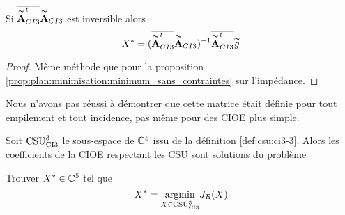     \begin{prop}
      Si \(\conj{\tilde{\mA}_{CI3}^t}\tilde{\mA}_{CI3}\) est inversible alors
      \begin{equation*}
        X^* = (\conj{\tilde{\mA}_{CI3}^t}\tilde{\mA}_{CI3})^{-1}\conj{\tilde{\mA}_{CI3}^t}\tilde{g}
      \end{equation*}
    \end{prop}
    \begin{proof}
      Même méthode que pour la proposition \ref{prop:plan:minimisation:minimum_sans_contraintes} sur l'impédance.
    \end{proof}

    Nous n'avons pas réussi à démontrer que cette matrice était définie pour tout empilement et tout incidence, pas même pour des CIOE plus simple.

    \begin{thm}

      Soit \(\CSU[3]{CI3}\) le sous-espace de \(\CC^5\) issu de la définition \ref{def:csu:ci3-3}.
      Alors les coefficients de la CIOE respectant les CSU sont solutions du problème

      Trouver \(X^* \in \CC^5\) tel que
      \begin{equation*}
        X^* = \argmin{X\in \CSU[3]{CI3}} J_R(X)
      \end{equation*}
    \end{thm}

    